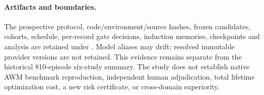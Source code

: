\paragraph{Artifacts and boundaries.}
The prospective protocol, code/environment/source hashes, frozen candidates,
cohorts, schedule, per-record gate decisions, induction memories, checkpoints
and analysis are retained under .
Model aliases may drift; resolved immutable provider versions are not retained.
This evidence remains separate from the historical 810-episode six-study
summary. The study does not establish native AWM benchmark reproduction,
independent human adjudication, total lifetime optimization cost, a new risk
certificate, or cross-domain superiority.
